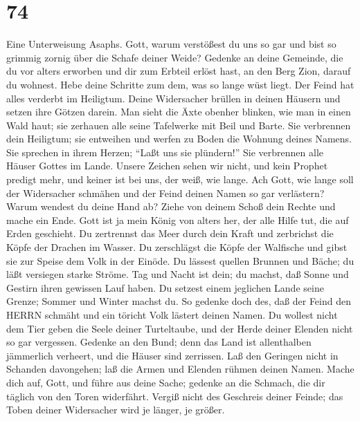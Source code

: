 \hypertarget{section-73}{%
\section{74}\label{section-73}}

 Eine Unterweisung Asaphs. Gott, warum verstößest du uns so
gar und bist so grimmig zornig über die Schafe deiner Weide?
 Gedenke an deine Gemeinde, die du vor alters erworben und
dir zum Erbteil erlöst hast, an den Berg Zion, darauf du wohnest.
 Hebe deine Schritte zum dem, was so lange wüst liegt. Der
Feind hat alles verderbt im Heiligtum.  Deine Widersacher
brüllen in deinen Häusern und setzen ihre Götzen darein. 
Man sieht die Äxte obenher blinken, wie man in einen Wald haut;
 sie zerhauen alle seine Tafelwerke mit Beil und Barte.
 Sie verbrennen dein Heiligtum; sie entweihen und werfen zu
Boden die Wohnung deines Namens.  Sie sprechen in ihrem
Herzen; ``Laßt uns sie plündern!'' Sie verbrennen alle Häuser Gottes im
Lande.  Unsere Zeichen sehen wir nicht, und kein Prophet
predigt mehr, und keiner ist bei uns, der weiß, wie lange. 
Ach Gott, wie lange soll der Widersacher schmähen und der Feind deinen
Namen so gar verlästern?  Warum wendest du deine Hand ab?
Ziehe von deinem Schoß dein Rechte und mache ein Ende. 
Gott ist ja mein König von alters her, der alle Hilfe tut, die auf Erden
geschieht.  Du zertrennst das Meer durch dein Kraft und
zerbrichst die Köpfe der Drachen im Wasser.  Du zerschlägst
die Köpfe der Walfische und gibst sie zur Speise dem Volk in der Einöde.
 Du lässest quellen Brunnen und Bäche; du läßt versiegen
starke Ströme.  Tag und Nacht ist dein; du machst, daß
Sonne und Gestirn ihren gewissen Lauf haben.  Du setzest
einem jeglichen Lande seine Grenze; Sommer und Winter machst du.
 So gedenke doch des, daß der Feind den HERRN schmäht und
ein töricht Volk lästert deinen Namen.  Du wollest nicht
dem Tier geben die Seele deiner Turteltaube, und der Herde deiner
Elenden nicht so gar vergessen.  Gedenke an den Bund; denn
das Land ist allenthalben jämmerlich verheert, und die Häuser sind
zerrissen.  Laß den Geringen nicht in Schanden davongehen;
laß die Armen und Elenden rühmen deinen Namen.  Mache dich
auf, Gott, und führe aus deine Sache; gedenke an die Schmach, die dir
täglich von den Toren widerfährt.  Vergiß nicht des
Geschreis deiner Feinde; das Toben deiner Widersacher wird je länger, je
größer.

